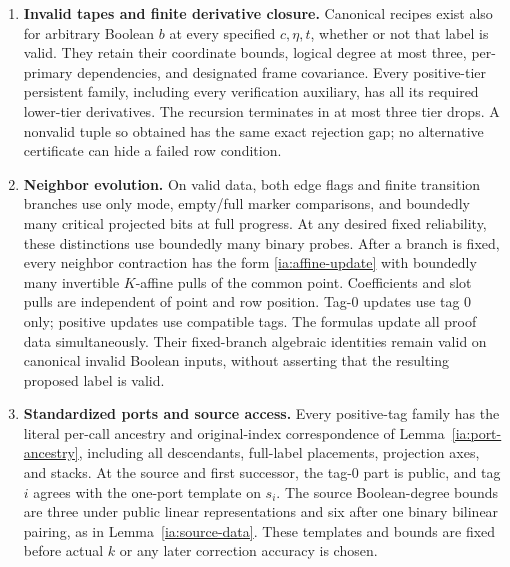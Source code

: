 \begin{lemma}
\begin{enumerate}
\item \textbf{Invalid tapes and finite derivative closure.}
Canonical recipes exist also for arbitrary Boolean $b$ at every
specified $c,\eta,t$, whether or not that label is valid.  They
retain their coordinate bounds, logical degree at most three,
per-primary dependencies, and designated frame covariance.
Every positive-tier persistent family, including every
verification auxiliary, has all its required lower-tier
derivatives.  The recursion terminates in at most three tier
drops.  A nonvalid tuple so obtained has the same exact rejection
gap; no alternative certificate can hide a failed row condition.

\item \textbf{Neighbor evolution.}
On valid data, both edge flags and finite transition branches use
only mode, empty/full marker comparisons, and boundedly many
critical projected bits at full progress.  At any desired fixed
reliability, these distinctions use boundedly many binary probes.
After a branch is fixed, every neighbor contraction has the
form \eqref{ia:affine-update} with boundedly many invertible
$K$-affine pulls of the common point.  Coefficients and slot
pulls are independent of point and row position.  Tag-$0$
updates use tag $0$ only; positive updates use compatible tags.
The formulas update all proof data simultaneously.  Their
fixed-branch algebraic identities remain valid on canonical
invalid Boolean inputs, without asserting that the resulting
proposed label is valid.

\item \textbf{Standardized ports and source access.}
Every positive-tag family has the literal per-call ancestry and
original-index correspondence of Lemma~\ref{ia:port-ancestry},
including all descendants, full-label placements, projection
axes, and stacks.  At the source and first successor, the
tag-$0$ part is public, and tag $i$ agrees with the one-port
template on $s_i$.  The source Boolean-degree bounds are three
under public linear representations and six after one binary
bilinear pairing, as in Lemma~\ref{ia:source-data}.  These
templates and bounds are fixed before actual $k$ or any later
correction accuracy is chosen.
\end{enumerate}
\end{lemma}

